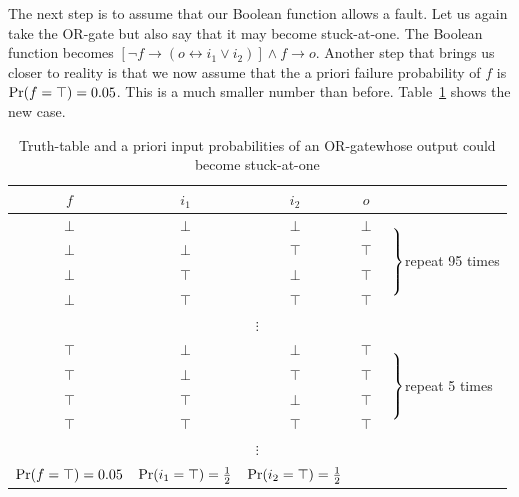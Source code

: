 \documentclass{article}
\begin{document}
The next step is to assume that our Boolean function allows a
fault. Let us again take the OR-gate but also say that it may become
stuck-at-one. The Boolean function becomes $\left[\neg{f} \rightarrow
  \left(o \leftrightarrow i_1 \vee i_2\right)\right] \wedge f
\rightarrow o$. Another step that brings us closer to reality is that
we now assume that the a priori failure probability of $f$ is $\mbox{Pr}(f =
  \top) = 0.05$. This is a much smaller number than
before. Table~\ref{tbl:or_fault} shows the new case.
%
\begin{table}[hbt]
\begin{center}
\begin{tabular}{ccccl}
  \toprule
  $f$     & $i_1$   & $i_2$    & $o$     & \\
  \midrule
  $\perp$ & $\perp$ & $\perp$  & $\perp$ & \multirow{4}{*}{$\left. \vphantom{\begin{tabular}{c}4\\4\\4\\4\end{tabular}}\right\}$repeat 95 times} \\
  $\perp$ & $\perp$ & $\top$   & $\top$  & \\
  $\perp$ & $\top$  & $\perp$  & $\top$  & \\
  $\perp$ & $\top$  & $\top$   & $\top$  & \\
  \multicolumn{5}{c}{$\vdots$}             \\
  $\top$  & $\perp$ & $\perp$  & $\top$  & \multirow{4}{*}{$\left. \vphantom{\begin{tabular}{c}4\\4\\4\\4\end{tabular}}\right\}$repeat 5 times} \\
  $\top$  & $\perp$ & $\top$   & $\top$  & \\
  $\top$  & $\top$  & $\perp$  & $\top$  & \\
  $\top$  & $\top$  & $\top$   & $\top$  & \\
  \multicolumn{5}{c}{$\vdots$}             \\
  \midrule
  $\mbox{Pr}(f = \top) = 0.05$ & $\mbox{Pr}(i_1 = \top) = \frac{1}{2}$ & $\mbox{Pr}(i_2 = \top) = \frac{1}{2}$ & \\
  \bottomrule
\end{tabular}
\end{center}
\caption{Truth-table and a priori input probabilities of an
  OR-gate\label{tbl:or_fault} whose output could become stuck-at-one}
\end{table}
\end{document}
